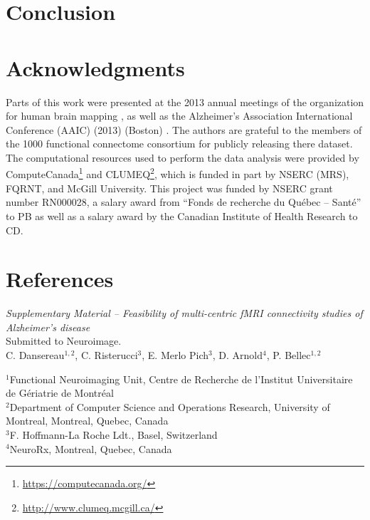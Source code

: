 \documentclass[authoryear]{elsarticle}
\begin{document}
\section{Conclusion}


\section{Acknowledgments}
Parts of this work were presented at the 2013 annual meetings of the organization for human brain mapping \citep{Dansereau2013a}, as well as the  Alzheimer's Association International Conference (AAIC) (2013) (Boston) \citep{Dansereau2013b}. The authors are grateful to the members of the 1000 functional connectome consortium for publicly releasing there dataset. The computational resources used to perform the data analysis were provided by ComputeCanada\footnote{\url{https://computecanada.org/}} and CLUMEQ\footnote{\url{http://www.clumeq.mcgill.ca/}}, which is funded in part by NSERC (MRS), FQRNT, and McGill University. This project was funded by NSERC grant number RN000028, a salary award from ``Fonds de recherche du Qu\'ebec -- Sant\'e'' to PB as well as a salary award by the Canadian Institute of Health Research to CD.

\section*{References}





\pagebreak



\clearpage
\appendix


\clearpage
\pagebreak
\renewcommand{\thefigure}{S\arabic{figure}}
\renewcommand{\thetable}{S\arabic{table}}
\setcounter{figure}{0}
\begin{center}
\emph{Supplementary Material {--} Feasibility of multi-centric fMRI connectivity studies of Alzheimer's disease}\\

\vspace{\baselineskip}Submitted to Neuroimage.\\

\vspace{\baselineskip}C. Dansereau$^{1,2}$,  C. Risterucci$^{3}$, E. Merlo Pich$^{3}$, D. Arnold$^{4}$, P. Bellec$^{1,2}$\\

\end{center}
$^1$Functional Neuroimaging Unit, Centre de Recherche de l'Institut Universitaire de G\'eriatrie de Montr\'eal\\
$^2$Department of Computer Science and Operations Research, University of Montreal, Montreal, Quebec, Canada\\
$^3$F. Hoffmann-La Roche Ldt., Basel, Switzerland\\
$^4$NeuroRx, Montreal, Quebec, Canada\\
\end{document}
